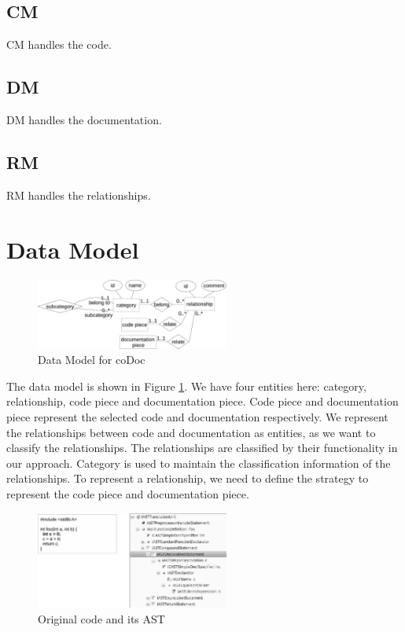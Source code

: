\documentclass[conference]{IEEEtran}
\begin{document}
\subsection{CM}
CM handles the code.

\subsection{DM}
DM handles the documentation.

\subsection{RM}
RM handles the relationships.


\section{Data Model}

\begin{figure}
\centering
\includegraphics[width=2.5in]{datamodel}
\caption{Data Model for coDoc}
\label{fig:datamodel}
\end{figure}

The data model is shown in Figure \ref{fig:datamodel}.
We have four entities here: category, relationship, code piece and documentation piece.
Code piece and documentation piece represent the selected code and documentation respectively.
We represent the relationships between code and documentation as entities,
as we want to classify the relationships.
The relationships are classified by their functionality in our approach.
Category is used to maintain the classification information of the relationships.
To represent a relationship, 
we need to define the strategy to represent the code piece and documentation piece.


\begin{figure}
\centering
\includegraphics[width=2.5in]{ast1}
\caption{Original code and its AST}
\label{fig:ast1}
\end{figure}
\end{document}
